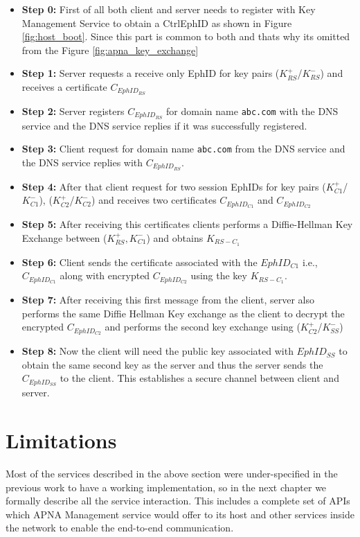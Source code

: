 \begin{itemize}
    \item \textbf{Step 0:} First of all both client and server needs to register with Key Management Service to obtain a CtrlEphID as shown in Figure \ref{fig:host_boot}. Since this part is common to both and thats why its omitted from the Figure \ref{fig:apna_key_exchange}
    \item \textbf{Step 1:} Server requests a receive only EphID for key pairs ($K^{+}_{RS}$/$K^{-}_{RS}$) and receives a certificate $C_{EphID_{RS}}$
    \item \textbf{Step 2:} Server registers $C_{EphID_{RS}}$ for domain name \texttt{abc.com} with the DNS service and the DNS service replies if it was successfully registered.
    \item \textbf{Step 3:} Client request for domain name \texttt{abc.com} from the DNS service and the DNS service replies with $C_{EphID_{RS}}$.
    \item \textbf{Step 4:} After that client request for two session EphIDs for key pairs ($K^{+}_{C1}$/$K^{-}_{C1}$), ($K^{+}_{C2}$/$K^{-}_{C2}$) and receives two certificates $C_{EphID_{C1}}$ and $C_{EphID_{C2}}$
    \item  \textbf{Step 5:} After receiving this certificates clients performs a Diffie-Hellman Key Exchange \cite{curve25519} between ($K^{+}_{RS}, K^{-}_{C1}$) and obtains $K_{RS-C_{1}}$
    \item \textbf{Step 6:} Client sends the certificate associated with the $EphID_{C1}$ i.e., $C_{EphID_{C1}}$ along with encrypted $C_{EphID_{C2}}$ using the key $K_{RS-C_{1}}$.
    \item \textbf{Step 7:} After receiving this first message from the client, server also performs the same Diffie Hellman Key exchange as the client to decrypt the encrypted $C_{EphID_{C2}}$ and performs the second key exchange using ($K^{+}_{C2}$/$K^{-}_{SS}$)
    \item \textbf{Step 8:} Now the client will need the public key associated with $EphID_{SS}$ to obtain the same second key as the server and thus the server sends the $C_{EphID_{SS}}$ to the client. This establishes a secure channel between client and server.
\end{itemize}

\section{Limitations}
Most of the services described in the above section were under-specified in the previous work \cite{taeho_thesis, source_accountability} to have a working implementation, so in the next chapter we formally describe all the service interaction. This includes a complete set of APIs which APNA Management service would offer to its host and other services inside the network to enable the end-to-end communication.